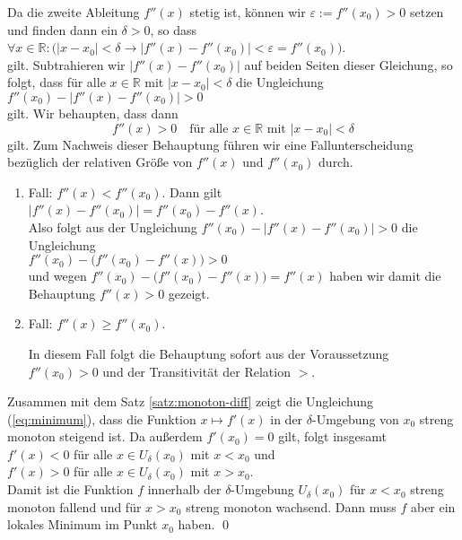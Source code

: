 \proof Da die zweite Ableitung $f''(x)$ stetig ist, k\"onnen wir $\varepsilon := f''(x_0) > 0$
setzen und finden dann ein $\delta > 0$, so dass
\\[0.2cm]
\hspace*{1.3cm}
 $\forall x \in \mathbb{R}:\bigl(
    |x - x_0| < \delta \rightarrow |f''(x) - f''(x_0)| < \varepsilon = f''(x_0)\bigr)
$.
\\[0.2cm]
gilt.  Subtrahieren wir $|f''(x) - f''(x_0)|$ auf beiden Seiten dieser Gleichung, so folgt, dass f\"ur
alle $x \in \mathbb{R}$ mit $|x - x_0| < \delta$ die Ungleichung
\\[0.2cm]
\hspace*{1.3cm} $f''(x_0) - |f''(x) - f''(x_0)| > 0$
\\[0.2cm]
gilt.  Wir behaupten, dass dann
\begin{equation}
  \label{eq:minimum}
 f''(x) > 0 \quad \mbox{f\"ur alle $x \in \mathbb{R}$ mit $|x - x_0| < \delta$} 
\end{equation}
gilt.
Zum Nachweis dieser Behauptung f\"uhren wir eine Fallunterscheidung bez\"uglich der relativen
Gr\"o{\ss}e von $f''(x)$ und $f''(x_0)$ durch.
\begin{enumerate}
\item Fall: $f''(x) < f''(x_0)$.  Dann gilt 
      \\[0.2cm]
      \hspace*{1.3cm}
      $|f''(x) - f''(x_0)| = f''(x_0) - f''(x)$.
      \\[0.2cm]
      Also folgt aus der Ungleichung $f''(x_0) - |f''(x) - f''(x_0)| > 0$ die Ungleichung
      \\[0.2cm]
      \hspace*{1.3cm}
      $f''(x_0) - \bigl(f''(x_0) - f''(x)\bigr) > 0$
      \\[0.2cm]
      und wegen $f''(x_0) - \bigl(f''(x_0) - f''(x)\bigr) = f''(x)$ haben wir damit die Behauptung
      $f''(x) > 0$ gezeigt.
\item Fall: $f''(x) \geq f''(x_0)$.  

      In diesem Fall folgt die Behauptung sofort aus der Voraussetzung
      $f''(x_0) > 0$ und der Transitivit\"at der Relation $>$.
\end{enumerate}
Zusammen mit dem Satz \ref{satz:monoton-diff} zeigt die Ungleichung (\ref{eq:minimum}), dass die Funktion
$x \mapsto f'(x)$ in der $\delta$-Umgebung von $x_0$ streng monoton steigend ist.  Da au{\ss}erdem
$f'(x_0) = 0$ gilt, folgt insgesamt 
\\[0.2cm]
\hspace*{1.3cm}
$f'(x) < 0$ \quad f\"ur alle $x\in U_\delta(x_0)$ mit $x < x_0$ \quad und \quad \\[0.2cm]
\hspace*{1.3cm}
$f'(x) > 0$ \quad f\"ur alle $x\in U_\delta(x_0)$ mit $x > x_0$.
\\[0.2cm]
Damit ist die Funktion $f$ innerhalb der $\delta$-Umgebung $U_\delta(x_0)$ f\"ur $x < x_0$
streng monoton fallend und f\"ur $x > x_0$ streng monoton wachsend.  Dann muss $f$ aber ein lokales
Minimum im Punkt $x_0$ haben. \qed


